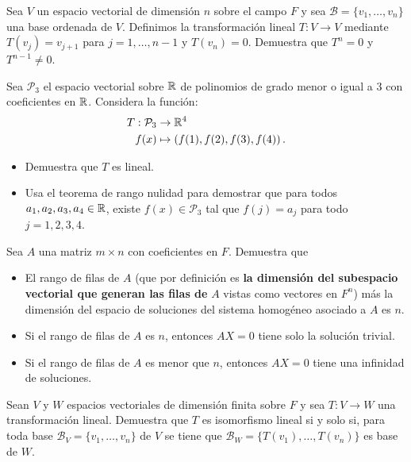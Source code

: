 \documentclass[12pt,a4paper]{book}
\newcommand{\llaves}[1]{\{#1\}}
\newcommand{\parentesis}[1]{\left(#1\right)}
\begin{document}
    \begin{ejercicio}
        Sea $V$ un espacio vectorial de dimensión $n$ sobre el campo $F$ y sea $\mathcal{B} = \llaves{v_1, \dots, v_n}$ una base ordenada de $V$. Definimos la transformación lineal $T:V \to V$ mediante $T(v_j) = v_{j + 1}$ para $j = 1, \dots, n-1$ y $T(v_n) = 0$. Demuestra que $T^n = 0$ y $T^{n-1} \neq 0$.
    \end{ejercicio}
    
    \begin{ejercicio}
        Sea $\mathcal{P}_3$ el espacio vectorial sobre $\mathbb{R}$ de polinomios de grado menor o igual a 3 con coeficientes en $\mathbb{R}$. Considera la función:
        \begin{align*}
            T: \mathcal{P}_3 & \to \R^4\\
            f(x) & \mapsto \parentesis{f(1), f(2), f(3), f(4)}.
        \end{align*}
        \begin{itemize}
            \item[(a)] Demuestra que $T$ es lineal.
            \item[(b)] Usa el teorema de rango nulidad para demostrar que para todos $a_1, a_2, a_3, a_4 \in \mathbb{R}$, existe $f(x) \in \mathcal{P}_3$ tal que $f(j) = a_j$ para todo $j = 1, 2, 3, 4$.
        \end{itemize}
    \end{ejercicio}

    \begin{ejercicio}
        Sea $A$ una matriz $m \times n$ con coeficientes en $F$. Demuestra que
        \begin{itemize}
            \item[(a)] El rango de filas de $A$ (que por definición es \textbf{la dimensión del subespacio vectorial que generan las filas de} $A$ vistas como vectores en $F^n$) más la dimensión del espacio de soluciones del sistema homogéneo asociado a $A$ es $n$.
            \item[(b)] Si el rango de filas de $A$ es $n$, entonces $AX = 0$ tiene solo la solución trivial.
            \item[(c)] Si el rango de filas de $A$ es menor que $n$, entonces $AX = 0$ tiene una infinidad de soluciones.
        \end{itemize}
    \end{ejercicio}
    
    \begin{ejercicio}
        Sean $V$ y $W$ espacios vectoriales de dimensión finita sobre $F$ y sea $T: V \to W$ una transformación lineal. Demuestra que $T$ es isomorfismo lineal si y solo si, para toda base $\mathcal{B}_V = \llaves{v_1, \dots, v_n}$ de $V$ se tiene que $\mathcal{B}_W = \llaves{T(v_1), \dots, T(v_n)}$ es base de $W$.
    \end{ejercicio}
\end{document}
